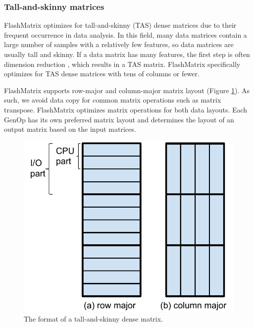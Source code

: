

\subsubsection{Tall-and-skinny matrices} \label{sec:tas_mat}

FlashMatrix optimizes for tall-and-skinny (TAS) dense matrices due to their
frequent occurrence in data analysis. In this field, many data matrices contain
a large number of samples with a relatively few features, so
data matrices are usually tall and skinny. If a data matrix has many
features, the first step is often dimension reduction \cite{Jain00}, which
results in a TAS matrix. FlashMatrix specifically optimizes for TAS dense
matrices with tens of columns or fewer.

FlashMatrix supports row-major and column-major matrix layout (Figure
\ref{fig:tas_mat}). As such, we avoid data copy for common matrix operations
such as matrix transpose. FlashMatrix optimizes matrix operations for both
data layouts. Each GenOp has its own preferred matrix layout and determines
the layout of an output matrix based on the input matrices.

\begin{figure}
	\centering
	\includegraphics[scale=0.5]{FlashMatrix_figs/dense_matrix.pdf}
	\caption{The format of a tall-and-skinny dense matrix.}
	\label{fig:tas_mat}
\end{figure}

